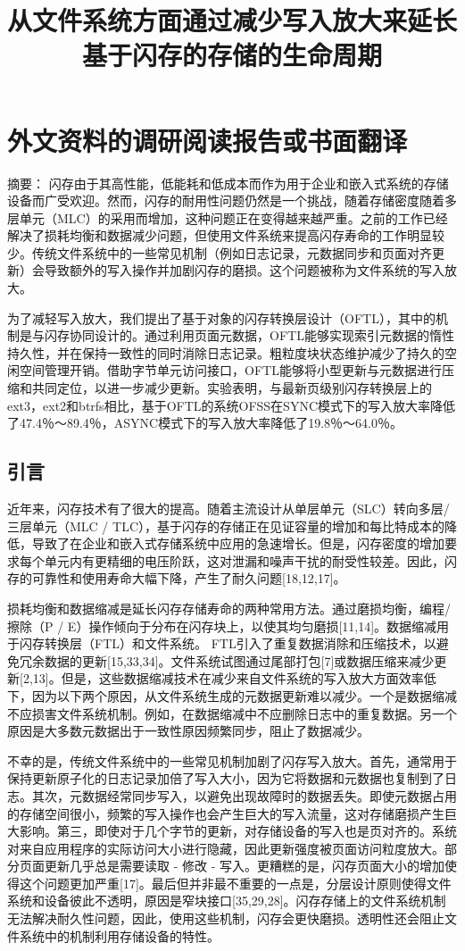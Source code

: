 \chapter{外文资料的调研阅读报告或书面翻译}

\title{从文件系统方面通过减少写入放大来延长基于闪存的存储的生命周期}

{\heiti 摘要：} 闪存由于其高性能，低能耗和低成本而作为用于企业和嵌入式系统的存储设备而广受欢迎。然而，闪存的耐用性问题仍然是一个挑战，随着存储密度随着多层单元（MLC）的采用而增加，这种问题正在变得越来越严重。之前的工作已经解决了损耗均衡和数据减少问题，但使用文件系统来提高闪存寿命的工作明显较少。传统文件系统中的一些常见机制（例如日志记录，元数据同步和页面对齐更新）会导致额外的写入操作并加剧闪存的磨损。这个问题被称为文件系统的写入放大。

为了减轻写入放大，我们提出了基于对象的闪存转换层设计（OFTL），其中的机制是与闪存协同设计的。通过利用页面元数据，OFTL能够实现索引元数据的惰性持久性，并在保持一致性的同时消除日志记录。粗粒度块状态维护减少了持久的空闲空间管理开销。借助字节单元访问接口，OFTL能够将小型更新与元数据进行压缩和共同定位，以进一步减少更新。实验表明，与最新页级别闪存转换层上的ext3，ext2和btrfs相比，基于OFTL的系统OFSS在SYNC模式下的写入放大率降低了47.4％〜89.4％，ASYNC模式下的写入放大率降低了19.8％〜64.0％。

\section{引言}
近年来，闪存技术有了很大的提高。随着主流设计从单层单元（SLC）转向多层/三层单元（MLC / TLC），基于闪存的存储正在见证容量的增加和每比特成本的降低，导致了在企业和嵌入式存储系统中应用的急速增长。但是，闪存密度的增加要求每个单元内有更精细的电压阶跃，这对泄漏和噪声干扰的耐受性较差。因此，闪存的可靠性和使用寿命大幅下降，产生了耐久问题[18,12,17]。

损耗均衡和数据缩减是延长闪存存储寿命的两种常用方法。通过磨损均衡，编程/擦除（P / E）操作倾向于分布在闪存块上，以使其均匀磨损[11,14]。数据缩减用于闪存转换层（FTL）和文件系统。 FTL引入了重复数据消除和压缩技术，以避免冗余数据的更新[15,33,34]。文件系统试图通过尾部打包[7]或数据压缩来减少更新[2,13]。但是，这些数据缩减技术在减少来自文件系统的写入放大方面效率低下，因为以下两个原因，从文件系统生成的元数据更新难以减少。一个是数据缩减不应损害文件系统机制。例如，在数据缩减中不应删除日志中的重复数据。另一个原因是大多数元数据出于一致性原因频繁同步，阻止了数据减少。

不幸的是，传统文件系统中的一些常见机制加剧了闪存写入放大。首先，通常用于保持更新原子化的日志记录加倍了写入大小，因为它将数据和元数据也复制到了日志。其次，元数据经常同步写入，以避免出现故障时的数据丢失。即使元数据占用的存储空间很小，频繁的写入操作也会产生巨大的写入流量，这对存储磨损产生巨大影响。第三，即使对于几个字节的更新，对存储设备的写入也是页对齐的。系统对来自应用程序的实际访问大小进行隐藏，因此更新强度被页面访问粒度放大。部分页面更新几乎总是需要读取 - 修改 - 写入。更糟糕的是，闪存页面大小的增加使得这个问题更加严重[17]。最后但并非最不重要的一点是，分层设计原则使得文件系统和设备彼此不透明，原因是窄块接口[35,29,28]。闪存存储上的文件系统机制无法解决耐久性问题，因此，使用这些机制，闪存会更快磨损。透明性还会阻止文件系统中的机制利用存储设备的特性。

